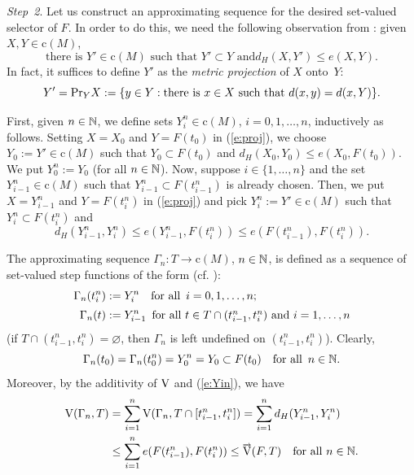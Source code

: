 \documentclass[preprint,12pt]{elsarticle}
\newcommand{\eq}[1]{\mbox{\rm(\ref{#1})}}
\newcommand{\es}{\varnothing}
\newcommand{\nV}{\mbox{\rm V}}
\newcommand{\riV}{{\scriptstyle\overrightarrow{\mbox{\rm V}}}}
\begin{document}
\begin{pfBV}
{\it Step~2}. Let us construct an approximating sequence for the desired set-valued
selector of $F$. In order to do this, we need the following observation from
\cite[assertion (10.2)]{Sovae}: given $X,Y\in\mbox{c}(M)$,
  \begin{equation} \label{e:proj}
\mbox{there is $Y'\in\mbox{c}(M)$ such that $Y'\subset Y$ and
$d_H(X,Y')\le e(X,Y)$.}
  \end{equation}
In fact, it suffices to define $Y'$ as the \emph{metric projection\/} of $X$ onto~$Y$:
  \begin{equation} \label{e:Pr}
Y'=\mbox{\rm Pr}_Y X:=\{y\in Y:\mbox{there is $x\in X$ such that $d(x,y)=d(x,Y)$}\}.
  \end{equation}

First, given $n\in\mathbb{N}$, we define sets $Y_i^n\in\mbox{c}(M)$, $i=0,1,\dots,n$,
inductively as follows. Setting $X=X_0$ and $Y=F(t_0)$ in \eq{e:proj}, we choose
$Y_0:=Y'\in\mbox{c}(M)$ such that $Y_0\subset F(t_0)$ and
$d_H(X_0,Y_0)\le e(X_0,F(t_0))$. We put $Y_0^n:=Y_0$ (for all $n\in\mathbb{N}$).
Now, suppose $i\in\{1,\dots,n\}$ and the set $Y_{i-1}^n\in\mbox{c}(M)$ such that
$Y_{i-1}^n\subset F(t_{i-1}^n)$ is already chosen. Then, we put $X=Y_{i-1}^n$
and $Y=F(t_i^n)$ in \eq{e:proj} and pick $Y_i^n:=Y'\in\mbox{c}(M)$ such that
$Y_i^n\subset F(t_i^n)$ and
  \begin{equation} \label{e:Yin}
d_H(Y_{i-1}^n,Y_i^n)\le e(Y_{i-1}^n,F(t_i^n))\le e(F(t_{i-1}^n),F(t_i^n)).
  \end{equation}

The approximating sequence $\Gamma_n:T\to\mbox{c}(M)$, $n\in\mathbb{N}$, is defined as
a sequence of set-valued step functions of the form (cf. \cite[equation~(10.3)]{Sovae}):
  \begin{align}
\Gamma_n(t_i^n)&:=Y_i^n\quad\mbox{for all \,$i=0,1,\dots,n;$}\label{e:4+}\\[2pt]
\Gamma_n(t)&:=Y_{i-1}^n\,\,\,\mbox{for all $t\in T\cap(t_{i-1}^n,t_i^n)$
  and $i=1,\dots,n$}\label{e:re}
  \end{align}
(if $T\cap(t_{i-1}^n,t_i^n)=\es$, then $\Gamma_n$ is left undefined
on $(t_{i-1}^n,t_i^n)$). Clearly,
  \begin{equation*}
\Gamma_n(t_0)=\Gamma_n(t_0^n)=Y_0^n=Y_0\subset F(t_0)\quad
\mbox{for all \,$n\in\mathbb{N}$.}
  \end{equation*}
Moreover, by the additivity of $\nV$ and \eq{e:Yin}, we have
  \begin{align}
\nV(\Gamma_n,T)&=\sum_{i=1}^n\nV(\Gamma_n,T\cap[t_{i-1}^n,t_i^n])
  =\sum_{i=1}^n d_H(Y_{i-1}^n,Y_i^n)\nonumber\\
&\le\sum_{i=1}^n e(F(t_{i-1}^n),F(t_i^n))\le\riV(F,T)
  \quad\mbox{for all $n\in\Nb$.} \label{e:gn}
  \end{align}


\end{pfBV}
\end{document}
